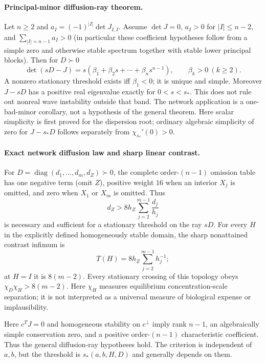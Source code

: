 \documentclass[10pt]{article}
\newcommand{\diag}{\operatorname{diag}}
\begin{document}
\paragraph{Principal-minor diffusion-ray theorem.}
Let $n\ge2$ and $a_I=(-1)^{|I|}\det J_{I,I}$.  Assume $\det J=0$, $a_I>0$ for
$|I|\le n-2$, and $\sum_{|I|=n-1}a_I>0$ (in particular these
coefficient hypotheses follow from a simple zero and otherwise stable
spectrum together with stable lower principal blocks).  Then for $D\succ0$
\[
\det(sD-J)=s(\beta_1+\beta_2s+\cdots+\beta_ns^{n-1}),\qquad \beta_k>0\ (k\ge2).
\]
A nonzero stationary threshold exists iff $\beta_1<0$; it is unique and simple. Moreover $J-sD$ has a positive real eigenvalue exactly for $0<s<s_*$. This does not rule out nonreal wave instability outside that band.  The
network application is a one-bad-minor corollary, not a hypothesis of the
general theorem.  Here scalar simplicity is first proved for the dispersion
root; ordinary algebraic simplicity of zero for $J-s_*D$ follows separately
from $\chi_{s_*}'(0)>0$.

\paragraph{Exact network diffusion law and sharp linear contrast.}
For $D=\diag(d_1,\ldots,d_m,d_Z)\succ0$, the complete order-$(n-1)$ omission table has one negative term (omit $Z$), positive weight $16$ when an interior $X_j$ is omitted, and zero when $X_1$ or $X_m$ is omitted. Thus
\[
\boxed{d_Z>8h_Z\sum_{j=2}^{m-1}\frac{d_j}{h_j}}
\]
is necessary and sufficient for a stationary threshold on the ray $sD$. For every $H$ in the explicitly defined homogeneously stable domain, the
sharp nonattained contrast infimum is
\[
T(H)=8h_Z\sum_{j=2}^{m-1}h_j^{-1};
\]
at $H=I$ it is $8(m-2)$. Every stationary crossing of this topology obeys
$\chi_D\chi_H>8(m-2)$.  Here $\chi_H$ measures equilibrium
concentration-scale separation; it is not interpreted as a universal measure
of biological expense or implausibility.

Here $c^TJ=0$ and homogeneous stability on $c^\perp$ imply rank $n-1$, an
algebraically simple conservation zero, and a positive order-$(n-1)$
characteristic coefficient.  Thus the general diffusion-ray hypotheses hold.
The criterion is independent of $a,b$, but the threshold is
$s_*(a,b,H,D)$ and generally depends on them.

\newpage
\end{document}
